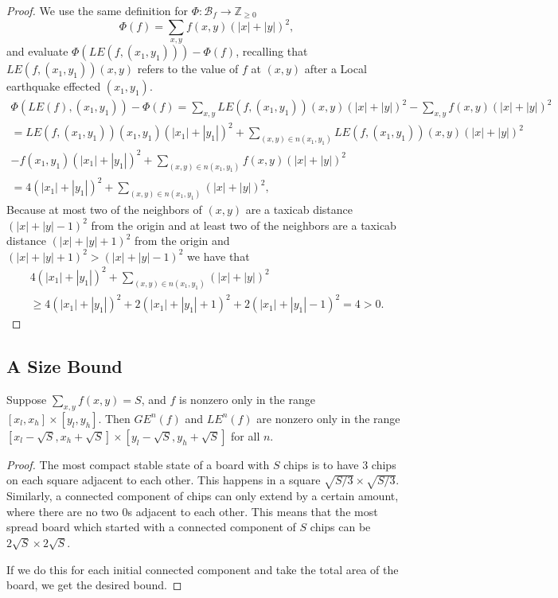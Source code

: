 \documentclass[runningheads,a4paper]{llncs}
\begin{document}
\begin{proof}
We use the same definition for $\Phi: \mathcal{B}_f \rightarrow \mathbb{Z}_{\geq 0}$ 
\[ \Phi(f) = \sum_{x,y} f(x,y)(|x|+|y|)^2, \]
and evaluate $\Phi(LE(f, (x_1,y_1))) - \Phi(f)$, recalling that $LE(f, (x_1, y_1))(x,y)$ refers to the value of  $f$ at $(x,y)$ after a Local earthquake effected $(x_1, y_1)$.
\begin{align*}
\Phi(LE(f), (x_1, y_1)) - \Phi(f) =\sum_{x,y} LE(f, (x_1, y_1))(x,y)(|x|+|y|)^2 - \sum_{x,y} f(x,y)(|x|+|y|)^2 \\
= LE(f, (x_1, y_1))(x_1,y_1)(|x_1|+|y_1|)^2 + \sum_{(x,y) \in n(x_1,y_1)} LE(f, (x_1, y_1)) (x,y) (|x|+|y|)^2 \\- f(x_1,y_1)(|x_1|+|y_1|)^2 + \sum_{(x,y) \in n(x_1, y_1)} f(x,y)(|x|+|y|)^2 \\
= 4(|x_1| + |y_1|)^2 +\sum_{(x,y) \in n(x_1, y_1)} (|x| + |y|)^2,
\end{align*}
Because at most two of the neighbors of $(x,y)$ are a taxicab distance $(|x|+|y|-1)^2$ from the origin and at least two of the neighbors are a taxicab distance $(|x|+|y|+1)^2$ from the origin and $(|x|+|y|+1)^2 > (|x|+|y|-1)^2$ we have that 
\begin{align*}
4(|x_1| + |y_1|)^2 +\sum_{(x,y) \in n(x_1, y_1)} (|x| + |y|)^2  \\ 
\geq 4(|x_1| + |y_1|)^2 + 2 (|x_1| + |y_1|+1)^2 + 2 (|x_1| + |y_1|-1)^2 = 4 >0.
\end{align*}
\end{proof}

\subsection{A Size Bound}
\begin{lemma}
\label{finiteextension}
Suppose $\sum_{x,y} f(x,y) = S$, and $f$ is nonzero only in the range $[x_l, x_h] \times [y_l, y_h]$. Then $GE^n(f)$ and $LE^n(f)$ are nonzero only in the range $[x_l - \sqrt{S}, x_h + \sqrt{S}] \times [y_l-\sqrt{S}, y_h+\sqrt{S}]$ for all $n$.
\end{lemma}

\begin{proof}
The most compact stable state of a board with $S$ chips is to have $3$ chips on each square adjacent to each other. This happens in a square $\sqrt{S/3} \times \sqrt{S/3}$. Similarly, a connected component of chips can only extend by a certain amount, where there are no two 0s adjacent to each other. This means that the most spread board which started with a connected component of $S$ chips can be $2\sqrt{S} \times 2\sqrt{S}$. 

If we do this for each initial connected component and take the total area of the board, we get the desired bound.
\end{proof}
\end{document}
